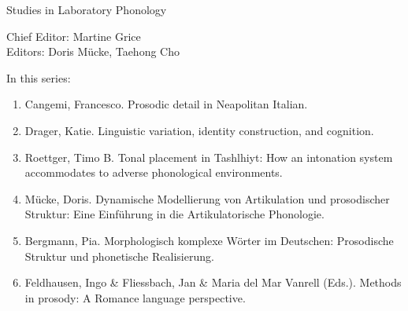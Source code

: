 
{\raggedleft{}}

\bigskip

{\large Studies in Laboratory Phonology}

\bigskip

Chief Editor:  Martine Grice%
\\
Editors:    Doris Mücke, %
    Taehong Cho %

\bigskip

In this series:

\begin{enumerate}
\item Cangemi, Francesco. Prosodic detail in Neapolitan Italian.
\item Drager, Katie. Linguistic variation, identity construction, and cognition.
\item Roettger, Timo B. Tonal placement in Tashlhiyt: How an intonation system accommodates to adverse phonological environments.
\item Mücke, Doris. Dynamische Modellierung von Artikulation und prosodischer Struktur: Eine Einführung in die Artikulatorische Phonologie.
\item Bergmann, Pia. Morphologisch komplexe Wörter im Deutschen: Prosodische Struktur und phonetische Realisierung. 
\item Feldhausen, Ingo \& Fliessbach, Jan \& Maria del Mar Vanrell (Eds.). Methods in prosody: A Romance language perspective.
\end{enumerate}
